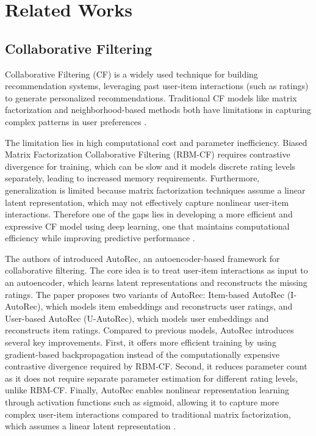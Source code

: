 \documentclass{ieeetj}
\begin{document}
\section{Related Works}

\subsection{Collaborative Filtering}
Collaborative Filtering (CF) is a widely used technique for building recommendation systems, leveraging past user-item interactions (such as ratings) to generate personalized recommendations. Traditional CF models like matrix factorization and neighborhood-based methods both have limitations in capturing complex patterns in user preferences \cite{sedhain2015autorec}.

The limitation lies in high computational cost and parameter inefficiency. Biased Matrix Factorization Collaborative Filtering (RBM-CF) requires contrastive divergence for training, which can be slow and it models discrete rating levels separately, leading to increased memory requirements. Furthermore, generalization is limited because matrix factorization techniques assume a linear latent representation, which may not effectively capture nonlinear user-item interactions. Therefore one of the gaps lies in developing a more efficient and expressive CF model using deep learning, one that maintains computational efficiency while improving predictive performance \cite{sedhain2015autorec}.

The authors of \cite{sedhain2015autorec} introduced AutoRec, an autoencoder-based framework for collaborative filtering. The core idea is to treat user-item interactions as input to an autoencoder, which learns latent representations and reconstructs the missing ratings. The paper proposes two variants of AutoRec: Item-based AutoRec (I-AutoRec), which models item embeddings and reconstructs user ratings, and User-based AutoRec (U-AutoRec), which models user embeddings and reconstructs item ratings. Compared to previous models, AutoRec introduces several key improvements. First, it offers more efficient training by using gradient-based backpropagation instead of the computationally expensive contrastive divergence required by RBM-CF. Second, it reduces parameter count as it does not require separate parameter estimation for different rating levels, unlike RBM-CF. Finally, AutoRec enables nonlinear representation learning through activation functions such as sigmoid, allowing it to capture more complex user-item interactions compared to traditional matrix factorization, which assumes a linear latent representation \cite{sedhain2015autorec}.
\end{document}
